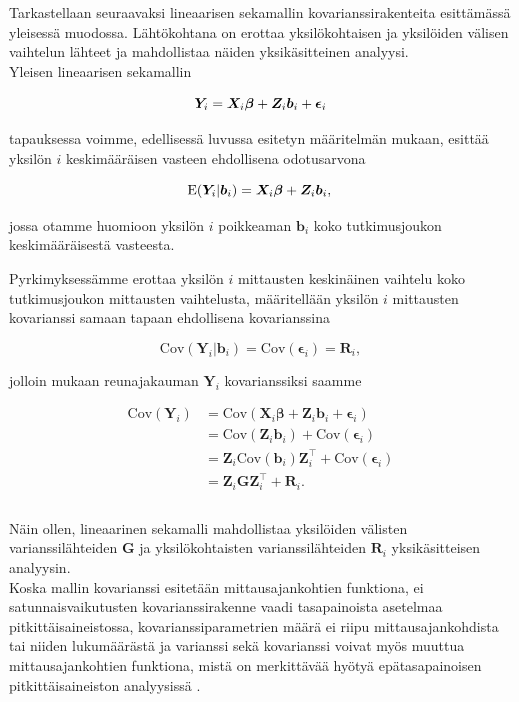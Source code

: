 \documentclass[finnish]{docopts}
\begin{document}
Tarkastellaan seuraavaksi lineaarisen sekamallin kovarianssirakenteita \cite{fitzmaurice11} esittämässä yleisessä muodossa. Lähtökohtana on erottaa yksilökohtaisen ja yksilöiden välisen vaihtelun lähteet ja mahdollistaa näiden yksikäsitteinen analyysi.\\

Yleisen lineaarisen sekamallin

$$
\bm{Y}_i = \bm{X}_i \bm{\beta} + \bm{Z}_i \bm{b}_i + \bm{\epsilon}_i \\
$$

tapauksessa voimme, edellisessä luvussa esitetyn määritelmän mukaan, esittää yksilön $i$ keskimääräisen vasteen ehdollisena odotusarvona

$$
\text{E}(\bm{Y}_i | \bm{b}_i) = \bm{X}_i \bm{\beta} + \bm{Z}_i \bm{b}_i, \\
$$

jossa otamme huomioon yksilön $i$ poikkeaman $\bm{b}_i$ koko tutkimusjoukon keskimääräisestä vasteesta.

Pyrkimyksessämme erottaa yksilön $i$ mittausten keskinäinen vaihtelu koko tutkimusjoukon mittausten vaihtelusta, määritellään yksilön $i$ mittausten kovarianssi samaan tapaan ehdollisena kovarianssina 

$$
\text{Cov}(\bm{Y}_i | \bm{b}_i) = \text{Cov}(\bm{\epsilon}_i) = \bm{R}_i,
$$

jolloin \cite{fitzmaurice11} mukaan reunajakauman $\bm{Y}_i$ kovarianssiksi saamme

$$
\begin{aligned}
\text{Cov}(\bm{Y}_i) &= \text{Cov}(\bm{X}_i \bm{\beta} +\bm{Z}_i\bm{b}_i + \bm{\epsilon}_i) \\
&= \text{Cov}(\bm{Z}_i \bm{b}_i) + \text{Cov}(\bm{\epsilon}_i) \\
&= \bm{Z}_i \text{Cov} (\bm{b}_i) \bm{Z}^\top_i + \text{Cov}(\bm{\epsilon}_i)\\
&= \bm{Z}_i \bm{G} \bm{Z}^\top_i + \bm{R}_i.\\
\end{aligned}
$$ \\

Näin ollen, lineaarinen sekamalli mahdollistaa yksilöiden välisten varianssilähteiden $\bm{G}$ ja yksilökohtaisten varianssilähteiden $\bm{R}_i$ yksikäsitteisen analyysin. \\

Koska mallin kovarianssi esitetään mittausajankohtien funktiona, ei satunnaisvaikutusten kovarianssirakenne vaadi tasapainoista asetelmaa pitkittäisaineistossa, kovarianssiparametrien määrä ei riipu mittausajankohdista tai niiden lukumäärästä ja varianssi sekä kovarianssi voivat myös muuttua mittausajankohtien funktiona, mistä on merkittävää hyötyä epätasapainoisen pitkittäisaineiston analyysissä \cite{fitzmaurice11}. \\
\end{document}
